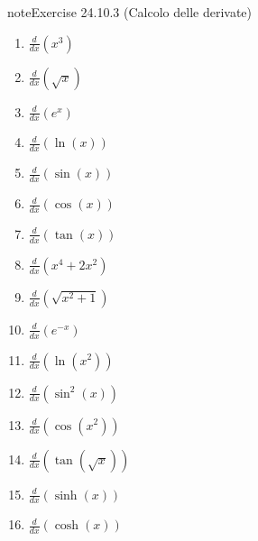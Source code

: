 \documentclass[letterpaper,10pt,italian]{jupyterBook}
\begin{document}
\begin{sphinxadmonition}{note}{Exercise 24.10.3 (Calcolo delle derivate)}


\begin{enumerate}
%
\item {} 
\sphinxAtStartPar
\(\frac{d}{dx} \left(x^3\right)\)

\item {} 
\sphinxAtStartPar
\(\frac{d}{dx} \left(\sqrt{x}\right)\)

\item {} 
\sphinxAtStartPar
\(\frac{d}{dx} \left(e^x\right)\)

\item {} 
\sphinxAtStartPar
\(\frac{d}{dx} \left(\ln(x)\right)\)

\item {} 
\sphinxAtStartPar
\(\frac{d}{dx} \left(\sin(x)\right)\)

\item {} 
\sphinxAtStartPar
\(\frac{d}{dx} \left(\cos(x)\right)\)

\item {} 
\sphinxAtStartPar
\(\frac{d}{dx} \left(\tan(x)\right)\)

\item {} 
\sphinxAtStartPar
\(\frac{d}{dx} \left(x^4 + 2x^2\right)\)

\item {} 
\sphinxAtStartPar
\(\frac{d}{dx} \left(\sqrt{x^2 + 1}\right)\)

\item {} 
\sphinxAtStartPar
\(\frac{d}{dx} \left(e^{-x}\right)\)

\item {} 
\sphinxAtStartPar
\(\frac{d}{dx} \left(\ln(x^2)\right)\)

\item {} 
\sphinxAtStartPar
\(\frac{d}{dx} \left(\sin^2(x)\right)\)

\item {} 
\sphinxAtStartPar
\(\frac{d}{dx} \left(\cos(x^2)\right)\)

\item {} 
\sphinxAtStartPar
\(\frac{d}{dx} \left(\tan(\sqrt{x})\right)\)

\item {} 
\sphinxAtStartPar
\(\frac{d}{dx} \left(\sinh(x)\right)\)

\item {} 
\sphinxAtStartPar
\(\frac{d}{dx} \left(\cosh(x)\right)\)


\end{enumerate}
\end{sphinxadmonition}
\end{document}
